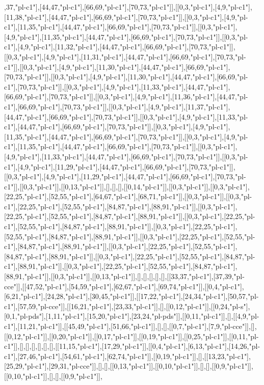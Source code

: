 ,37,"pl-c1"],[44,47,"pl-c1"],[66,69,"pl-c1"],[70,73,"pl-c1"]],[[0,3,"pl-c1"],[4,9,"pl-c1"],[11,38,"pl-c1"],[44,47,"pl-c1"],[66,69,"pl-c1"],[70,73,"pl-c1"]],[[0,3,"pl-c1"],[4,9,"pl-c1"],[11,35,"pl-c1"],[44,47,"pl-c1"],[66,69,"pl-c1"],[70,73,"pl-c1"]],[[0,3,"pl-c1"],[4,9,"pl-c1"],[11,35,"pl-c1"],[44,47,"pl-c1"],[66,69,"pl-c1"],[70,73,"pl-c1"]],[[0,3,"pl-c1"],[4,9,"pl-c1"],[11,32,"pl-c1"],[44,47,"pl-c1"],[66,69,"pl-c1"],[70,73,"pl-c1"]],[[0,3,"pl-c1"],[4,9,"pl-c1"],[11,31,"pl-c1"],[44,47,"pl-c1"],[66,69,"pl-c1"],[70,73,"pl-c1"]],[[0,3,"pl-c1"],[4,9,"pl-c1"],[11,30,"pl-c1"],[44,47,"pl-c1"],[66,69,"pl-c1"],[70,73,"pl-c1"]],[[0,3,"pl-c1"],[4,9,"pl-c1"],[11,30,"pl-c1"],[44,47,"pl-c1"],[66,69,"pl-c1"],[70,73,"pl-c1"]],[[0,3,"pl-c1"],[4,9,"pl-c1"],[11,33,"pl-c1"],[44,47,"pl-c1"],[66,69,"pl-c1"],[70,73,"pl-c1"]],[[0,3,"pl-c1"],[4,9,"pl-c1"],[11,36,"pl-c1"],[44,47,"pl-c1"],[66,69,"pl-c1"],[70,73,"pl-c1"]],[[0,3,"pl-c1"],[4,9,"pl-c1"],[11,37,"pl-c1"],[44,47,"pl-c1"],[66,69,"pl-c1"],[70,73,"pl-c1"]],[[0,3,"pl-c1"],[4,9,"pl-c1"],[11,33,"pl-c1"],[44,47,"pl-c1"],[66,69,"pl-c1"],[70,73,"pl-c1"]],[[0,3,"pl-c1"],[4,9,"pl-c1"],[11,35,"pl-c1"],[44,47,"pl-c1"],[66,69,"pl-c1"],[70,73,"pl-c1"]],[[0,3,"pl-c1"],[4,9,"pl-c1"],[11,35,"pl-c1"],[44,47,"pl-c1"],[66,69,"pl-c1"],[70,73,"pl-c1"]],[[0,3,"pl-c1"],[4,9,"pl-c1"],[11,33,"pl-c1"],[44,47,"pl-c1"],[66,69,"pl-c1"],[70,73,"pl-c1"]],[[0,3,"pl-c1"],[4,9,"pl-c1"],[11,29,"pl-c1"],[44,47,"pl-c1"],[66,69,"pl-c1"],[70,73,"pl-c1"]],[[0,3,"pl-c1"],[4,9,"pl-c1"],[11,29,"pl-c1"],[44,47,"pl-c1"],[66,69,"pl-c1"],[70,73,"pl-c1"]],[[0,3,"pl-c1"]],[[0,13,"pl-c1"]],[],[],[],[[0,14,"pl-c1"]],[[0,3,"pl-c1"]],[[0,3,"pl-c1"],[22,25,"pl-c1"],[52,55,"pl-c1"],[64,67,"pl-c1"],[68,71,"pl-c1"]],[[0,3,"pl-c1"]],[[0,3,"pl-c1"],[22,25,"pl-c1"],[52,55,"pl-c1"],[84,87,"pl-c1"],[88,91,"pl-c1"]],[[0,3,"pl-c1"],[22,25,"pl-c1"],[52,55,"pl-c1"],[84,87,"pl-c1"],[88,91,"pl-c1"]],[[0,3,"pl-c1"],[22,25,"pl-c1"],[52,55,"pl-c1"],[84,87,"pl-c1"],[88,91,"pl-c1"]],[[0,3,"pl-c1"],[22,25,"pl-c1"],[52,55,"pl-c1"],[84,87,"pl-c1"],[88,91,"pl-c1"]],[[0,3,"pl-c1"],[22,25,"pl-c1"],[52,55,"pl-c1"],[84,87,"pl-c1"],[88,91,"pl-c1"]],[[0,3,"pl-c1"],[22,25,"pl-c1"],[52,55,"pl-c1"],[84,87,"pl-c1"],[88,91,"pl-c1"]],[[0,3,"pl-c1"],[22,25,"pl-c1"],[52,55,"pl-c1"],[84,87,"pl-c1"],[88,91,"pl-c1"]],[[0,3,"pl-c1"],[22,25,"pl-c1"],[52,55,"pl-c1"],[84,87,"pl-c1"],[88,91,"pl-c1"]],[[0,3,"pl-c1"]],[[0,13,"pl-c1"]],[],[],[],[],[],[[33,37,"pl-c1"],[37,39,"pl-cce"]],[[47,52,"pl-c1"],[54,59,"pl-c1"],[62,67,"pl-c1"],[69,74,"pl-c1"]],[[0,4,"pl-c1"],[6,21,"pl-c1"],[24,28,"pl-c1"],[30,45,"pl-c1"]],[[17,22,"pl-c1"],[24,34,"pl-c1"],[50,57,"pl-c1"],[57,59,"pl-cce"]],[[16,21,"pl-c1"],[23,33,"pl-c1"]],[],[[0,12,"pl-c1"]],[[0,24,"pl-s"],[0,1,"pl-pds"],[1,11,"pl-c1"],[15,20,"pl-c1"],[23,24,"pl-pds"]],[[0,11,"pl-c1"]],[],[[4,9,"pl-c1"],[11,21,"pl-c1"]],[[45,49,"pl-c1"],[51,66,"pl-c1"]],[],[],[[0,7,"pl-c1"],[7,9,"pl-cce"]],[],[[0,12,"pl-c1"]],[[0,20,"pl-c1"]],[[0,17,"pl-c1"]],[[0,19,"pl-c1"]],[[0,25,"pl-c1"]],[[0,11,"pl-c1"]],[],[],[],[],[],[],[[11,15,"pl-c1"],[17,29,"pl-c1"]],[[0,4,"pl-c1"],[6,13,"pl-c1"],[14,26,"pl-c1"],[27,46,"pl-c1"],[54,61,"pl-c1"],[62,74,"pl-c1"]],[[0,19,"pl-c1"]],[],[[13,23,"pl-c1"],[25,29,"pl-c1"],[29,31,"pl-cce"]],[],[],[[0,13,"pl-c1"]],[[0,10,"pl-c1"]],[],[],[[0,9,"pl-c1"]],[[0,10,"pl-c1"]],[],[],[[0,9,"pl-c1"]],